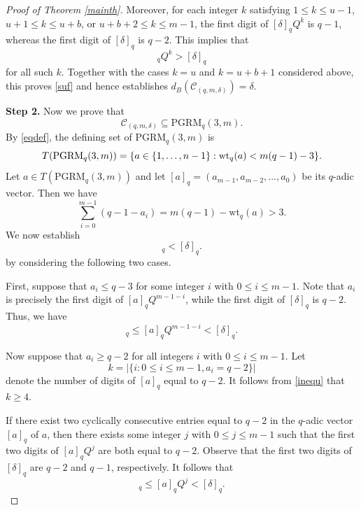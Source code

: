 \documentclass[journal,onecolumn]{IEEEtran}
\newcommand{\cl}{\operatorname{cl}}
\begin{document}
\begin{proof}[Proof of Theorem \ref{mainth}]
Moreover, for each integer  $k$ satisfying $1\leq k\leq u-1$,
$u+1\leq k\leq u+b$, or $u+b+2\leq k\leq m-1$, 
the first digit of $[\delta]_q Q^k$ is $q-1$, whereas the first digit of
$[\delta]_q$ is $q-2$.
This implies that
\begin{equation*}
    [\delta]_q Q^k > [\delta]_q
\end{equation*}
for all such $k$. Together with the cases $k=u$ and $k=u+b+1$ considered above, this
proves \eqref{suf} and hence establishes
$d_B(\mathcal{C}_{(q,m,\delta)})=\delta$.

{\bf Step 2.} Now we prove that
\begin{equation}\label{contain}
\mathcal{C}_{(q,m,\delta)}
\subseteq
\mathrm{PGRM}_q(3,m).
\end{equation}
By \eqref{eqdef},  the defining set of $\mathrm{PGRM}_q(3,m)$  is 
\begin{equation}\notag
T(\mathrm{PGRM}_q(3,m)) = \{ a \in \{ 1, \dots, n-1\} : \mathrm{wt}_q(a) < m(q-1)-3 \}.
\end{equation}
Let $a \in T(\mathrm{PGRM}_q(3,m))$ and let $[a]_q = (a_{m-1}, a_{m-2}, \dots, a_0)$ be its $q$-adic vector. Then we have
\begin{equation}\label{inequ}
    \sum_{i=0}^{m-1} (q - 1 - a_i) = m(q-1) - \mathrm{wt}_q(a) > 3.
\end{equation}
We now establish
\begin{equation*}
   [\cl(a)]_q < [\delta]_q.
\end{equation*}
by considering the following two cases.

First, suppose that $a_i \le q - 3$ for some integer $i$ with $0\leq i \leq  m-1$. Note that $a_i$ is precisely the first digit of $[a]_q Q^{m-1-i}$, while the first digit of $[\delta]_q$ is $q-2$. Thus, we have
\begin{equation*}
    [\cl(a)]_q \le [a]_q Q^{m-1-i} < [\delta]_q.
\end{equation*}

Now suppose that $a_i \ge q - 2$ for all integers $i$ with $0\leq i\leq m-1 $. Let
\begin{equation*}
k = |\{i : 0\leq i\leq m-1, a_i = q-2\}|
\end{equation*}
denote the number of digits of $[a]_q$  equal to $q-2$. It follows from \eqref{inequ} that $k \ge 4$.

If there exist two cyclically consecutive entries equal to $q-2$ in the $q$-adic vector $[a]_q$ of $a$, then there exists some integer $j$ with $0\leq j \leq   m-1$ such that the first two digits of $[a]_q Q^j$ are both equal to $q-2$. Observe that the first two digits of $[\delta]_q$ are $q-2$ and $q-1$, respectively.
It follows  that
\begin{equation*}
    [\mathrm{cl}(a)]_q \le [a]_q Q^j < [\delta]_q.
\end{equation*}


\end{proof}
\end{document}
